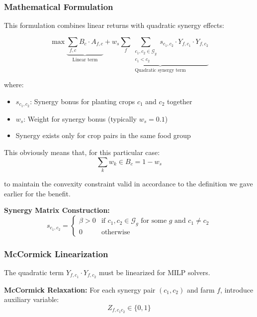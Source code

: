 \documentclass{article}
\begin{document}
\subsubsection{Mathematical Formulation}

This formulation combines linear returns with quadratic synergy effects:

\begin{equation}
\max \underbrace{\sum_{f,c} B_c \cdot A_{f,c}}_{\text{Linear term}} + \underbrace{w_s \sum_f \sum_{\substack{c_1,c_2 \in \mathcal{G}_g\\ c_1 < c_2}} s_{c_1,c_2} \cdot Y_{f,c_1} \cdot Y_{f,c_2}}_{\text{Quadratic synergy term}}
\label{eq:lq_obj}
\end{equation}

where:
\begin{itemize}
    \item $s_{c_1,c_2}$: Synergy bonus for planting crops $c_1$ and $c_2$ together
    \item $w_s$: Weight for synergy bonus (typically $w_s = 0.1$)
    \item Synergy exists only for crop pairs in the same food group
\end{itemize}

This obviously means that, for this particular case:
\begin{equation}
    \sum_k w_k \in B_c = 1-w_s
\end{equation}

to maintain the convexity constraint valid in accordance to the definition we gave earlier for the benefit.


\textbf{Synergy Matrix Construction:}
\begin{equation}
s_{c_1,c_2} = \begin{cases}
\beta > 0 & \text{if } c_1, c_2 \in \mathcal{G}_g \text{ for some } g \text{ and } c_1 \neq c_2\\
0 & \text{otherwise}
\end{cases}
\end{equation}


\subsubsection{McCormick Linearization}

The quadratic term $Y_{f,c_1} \cdot Y_{f,c_2}$ must be linearized for MILP solvers.

\textbf{McCormick Relaxation:}
For each synergy pair $(c_1, c_2)$ and farm $f$, introduce auxiliary variable:
\begin{equation}
Z_{f,c_1c_2} \in \{0,1\}
\end{equation}
\end{document}
